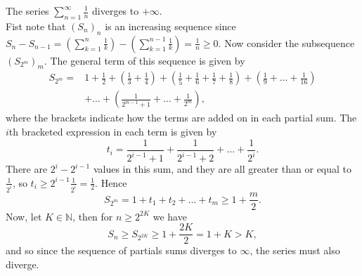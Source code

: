 \documentclass[../real_analysis.tex]{subfiles}
\begin{document}
            \begin{example}
                The series $\sum_{n=1}^\infty\frac{1}{n}$ diverges to $+\infty$.\\
                Fist note that $(S_n)_n$ is an increasing sequence since $S_n-S_{n-1}=\left(\sum_{k=1}^n\frac{1}{k}\right)-\left(\sum_{k=1}^{n-1}\frac{1}{k}\right)=\frac{1}{n}\geq0$. Now consider the subsequence $(S_{2^m})_m$. The general term of this sequence is given by
                \begin{align}
                    S_{2^m}=&1+\frac{1}{2}+\left(\frac{1}{3}+\frac{1}{4}\right)+\left(\frac{1}{5}+\frac{1}{6}+\frac{1}{7}+\frac{1}{8}\right)+\left(\frac{1}{9}+\dots+\frac{1}{16}\right)\\
                    &+\dots+\left(\frac{1}{2^{m-1}+1}+\dots+\frac{1}{2^m}\right),
                \end{align}
                where the brackets indicate how the terms are added on in each partial sum. The $i$th bracketed expression in each term is given by
                \begin{equation}
                    t_i=\frac{1}{2^{i-1}+1}+\frac{1}{2^{i-1}+2}+\dots+\frac{1}{2^i}.
                \end{equation}
                There are $2^i-2^{i-1}$ values in this sum, and they are all greater than or equal to $\frac{1}{2^i}$, so $t_i\geq2^{i-1}\frac{1}{2^i}=\frac{1}{2}$. Hence
                \begin{equation}
                    S_{2^m}=1+t_1+t_2+\dots+t_m\geq1+\frac{m}{2}.
                \end{equation}
                Now, let $K\in\mathbb{N}$, then for $n\geq2^{2K}$ we have
                \begin{equation}
                    S_n\geq S_{2^{2K}}\geq 1+\frac{2K}{2}=1+K>K,
                \end{equation}
                and so since the sequence of partials sums diverges to $\infty$, the series must also diverge.
            \end{example}
\end{document}
